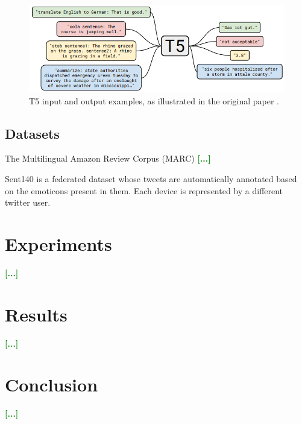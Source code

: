\documentclass{esannV2}
\begin{document}
\begin{figure}[h]
\begin{center}
\includegraphics[width=\textwidth]{pics/T5.png}
\caption{T5 input and output examples, as illustrated in the original paper \cite{t5}.}
\label{fig:user}
\end{center}
\end{figure}

\subsection{Datasets}
The Multilingual Amazon Review Corpus (MARC) \cite{keung2020multilingual} \textcolor{green}{\textbf{[...]}}


Sent140 \cite{caldas2019leaf} is a federated dataset whose tweets are automatically annotated based on the emoticons present in them. Each device is represented by a different twitter user.

\section{Experiments}
\textcolor{green}{\textbf{[...]}}

\section{Results}
\textcolor{green}{\textbf{[...]}}

\section{Conclusion}
\textcolor{green}{\textbf{[...]}}



\begin{footnotesize}




\end{footnotesize}

%
\end{document}
